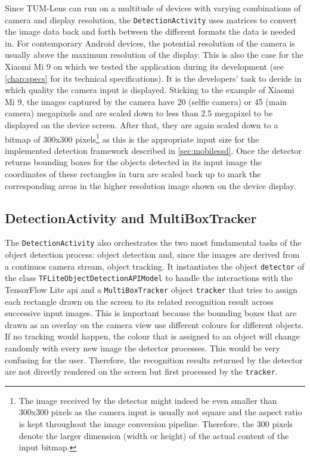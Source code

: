 \documentclass[
			   fontsize=11pt,
               paper=a4,
               bibliography=totoc,
               idxtotoc,
               headsepline,
               footsepline,
               footinclude=false,
               BCOR=12mm,
               DIV=13,
               openany,   %
               ]
               {scrbook}
\newcommand{\code}[1]{\lstinline[basicstyle = \ttfamily\small]{#1}} %
\begin{document}
Since TUM-Lens can run on a multitude of devices with varying combinations of camera and display resolution, the \code{DetectionActivity} uses matrices to convert the image data back and forth between the different formats the data is needed in. For contemporary Android devices, the potential resolution of the camera is usually above the maximum resolution of the display. This is also the case for the Xiaomi Mi 9 on which we tested the application during its development (see \autoref{chap:specs} for its technical specifications). It is the developers' task to decide in which quality the camera input is displayed. Sticking to the example of Xiaomi Mi 9, the images captured by the camera have 20 (selfie camera) or 45 (main camera) megapixels and are scaled down to less than 2.5 megapixel to be displayed on the device screen. After that, they are again scaled down to a bitmap of 300x300 pixels\footnote{The image received by the detector might indeed be even smaller than 300x300 pixels as the camera input is usually not square and the aspect ratio is kept throughout the image conversion pipeline. Therefore, the 300 pixels denote the larger dimension (width or height) of the actual content of the input bitmap.} as this is the appropriate input size for the implemented detection framework described in \autoref{sec:mobilessd}. Once the detector returns bounding boxes for the objects detected in its input image the coordinates of these rectangles in turn are scaled back up to mark the corresponding areas in the higher resolution image shown on the device display.

\subsection{DetectionActivity and MultiBoxTracker} \label{ssec:detectionAndTracking}

The \code{DetectionActivity} also orchestrates the two most fundamental tasks of the object detection process: object detection and, since the images are derived from a continuos camera stream, object tracking. It instantiates the object \code{detector} of the class \code{TFLiteObjectDetectionAPIModel} to handle the interactions with the TensorFlow Lite \gls{api} and a \code{MultiBoxTracker} object \code{tracker} that tries to assign each rectangle drawn on the screen to its related recognition result across successive input images. This is important because the bounding boxes that are drawn as an overlay on the camera view use different colours for different objects. If no tracking would happen, the colour that is assigned to an object will change randomly with every new image the detector processes. This would be very confusing for the user. Therefore, the recognition results returned by the detector are not directly rendered on the screen but first processed by the \code{tracker}. \\
\end{document}
